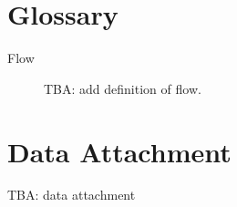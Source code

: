 \documentclass[
    digital,
    color,
    11pt,
    nocover,
    table,  %
    nolof,  %
    nolot,  %
    microtype,
]{fithesis3}
\begin{document}









\printbibliography[heading=bibintoc]

\appendix

\chapter{Glossary}
\label{chap:glossary}

\begin{description}
    \item[Flow] TBA: add definition of flow.
\end{description}

\chapter{Data Attachment}
\label{chap:data}

TBA: data attachment
\end{document}
